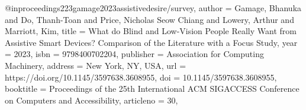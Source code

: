 @inproceedings{223gamage2023assistivedesire/survey,
author = {Gamage, Bhanuka and Do, Thanh-Toan and Price, Nicholas Seow Chiang and Lowery, Arthur and Marriott, Kim},
title = {What do Blind and Low-Vision People Really Want from Assistive Smart Devices? Comparison of the Literature with a Focus Study},
year = {2023},
isbn = {9798400702204},
publisher = {Association for Computing Machinery},
address = {New York, NY, USA},
url = {https://doi.org/10.1145/3597638.3608955},
doi = {10.1145/3597638.3608955},
booktitle = {Proceedings of the 25th International ACM SIGACCESS Conference on Computers and Accessibility},
articleno = {30},
}